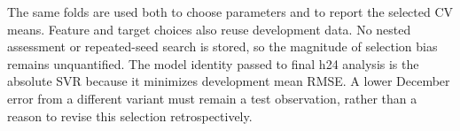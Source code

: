 The same folds are used both to choose parameters and to report the selected CV means. Feature and target choices also reuse development data. No nested assessment or repeated-seed search is stored, so the magnitude of selection bias remains unquantified. The model identity passed to final h24 analysis is the absolute SVR because it minimizes development mean RMSE. A lower December error from a different variant must remain a test observation, rather than a reason to revise this selection retrospectively.
